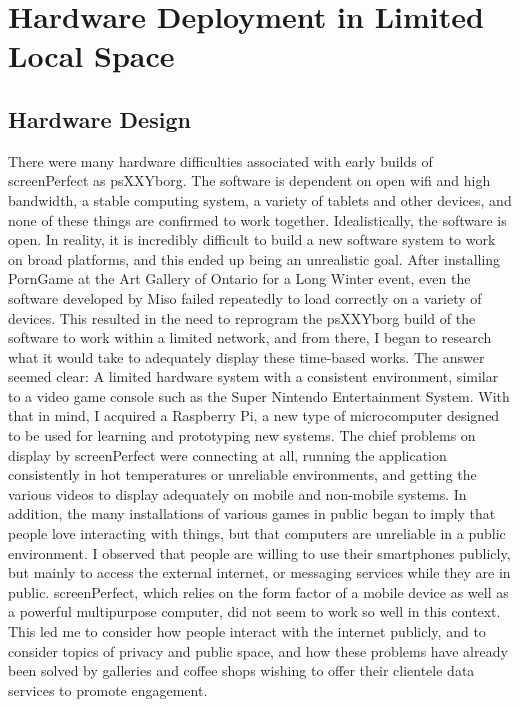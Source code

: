 
\chapter{Hardware Deployment in Limited Local Space} %

\label{Chapter4} 


\section{Hardware Design}
There were many hardware difficulties associated with early builds of screenPerfect as psXXYborg. The software is dependent on open wifi and high bandwidth, a stable computing system, a variety of tablets and other devices, and none of these things are confirmed to work together. Idealistically, the software is open. In reality, it is incredibly difficult to build a new software system to work on broad platforms, and this ended up being an unrealistic goal.
After installing PornGame at the Art Gallery of Ontario for a Long Winter event, even the software developed by Miso failed repeatedly to load correctly on a variety of devices. This resulted in the need to reprogram the psXXYborg build of the software to work within a limited network, and from there, I began to research what it would take to adequately display these time-based works. The answer seemed clear: A limited hardware system with a consistent environment, similar to a video game console such as the Super Nintendo Entertainment System. 
With that in mind, I acquired a Raspberry Pi, a new type of microcomputer designed to be used for learning and prototyping new systems. The chief problems on display by screenPerfect were connecting at all, running the application consistently in hot temperatures or unreliable environments, and getting the various videos to display adequately on mobile and non-mobile systems. In addition, the many installations of various games in public began to imply that people love interacting with things, but that computers are unreliable in a public environment. 
I observed that people are willing to use their smartphones publicly, but mainly to access the external internet, or messaging services while they are in public. screenPerfect, which relies on the form factor of a mobile device as well as a powerful multipurpose computer, did not seem to work so well in this context.
This led me to consider how people interact with the internet publicly, and to consider topics of privacy and public space, and how these problems have already been solved by galleries and coffee shops wishing to offer their clientele data services to promote engagement.
